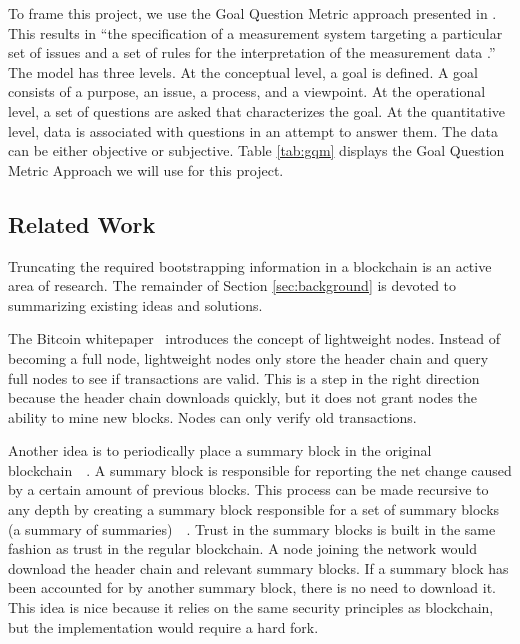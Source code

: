 To frame this project, we use the Goal Question Metric approach presented in \cite{basili1994goal}.
This results in ``the specification of a measurement system targeting a particular set of issues and a set of rules for the interpretation of the measurement data \cite{basili1994goal}.''
The model has three levels.
At the conceptual level, a goal is defined.
A goal consists of a purpose, an issue, a process, and a viewpoint.
At the operational level, a set of questions are asked that characterizes the goal.
At the quantitative level, data is associated with questions in an attempt to answer them.
The data can be either objective or subjective.
Table \ref{tab:gqm} displays the Goal Question Metric Approach we will use for this project.

\newpage 



\subsection{Related Work}

Truncating the required bootstrapping information in a blockchain is an active area of research.
The remainder of Section \ref{sec:background} is devoted to summarizing existing ideas and solutions.


The Bitcoin whitepaper~\cite{nakamoto2009Bitcoin} introduces the concept of lightweight nodes.
Instead of becoming a full node, lightweight nodes only store the header chain and query full nodes to see if transactions are valid.
This is a step in the right direction because the header chain downloads quickly, but it does not grant nodes the ability to mine new blocks.
Nodes can only verify old transactions.


Another idea is to periodically place a summary block in the original blockchain~\cite{palai2018BlockSummariesSameChain}~\cite{nadiya2018BlockSummaries(ExtendsPalai)}.
A summary block is responsible for reporting the net change caused by a certain amount of previous blocks.
This process can be made recursive to any depth by creating a summary block responsible for a set of summary blocks (a summary of summaries)~\cite{palai2018BlockSummariesSameChain}~\cite{nadiya2018BlockSummaries(ExtendsPalai)}.
Trust in the summary blocks is built in the same fashion as trust in the regular blockchain.
A node joining the network would download the header chain and relevant summary blocks.
If a summary block has been accounted for by another summary block, there is no need to download it.
This idea is nice because it relies on the same security principles as blockchain, but the implementation would require a hard fork.

